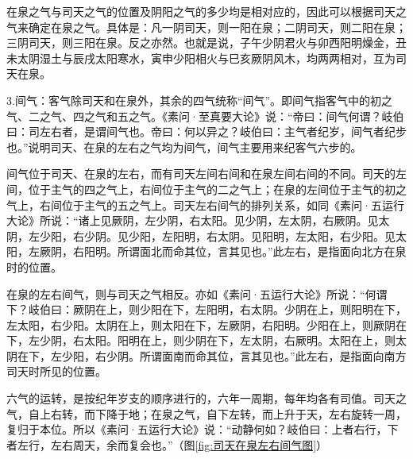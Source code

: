 \documentclass[12pt]{ctexbook}
\begin{document}
在泉之气与司天之气的位置及阴阳之气的多少均是相对应的，因此可以根据司天之气来确定在泉之气。具体是：凡一阴司天，则一阳在泉；二阴司天，则二阳在泉；三阴司天，则三阳在泉。反之亦然。也就是说，子午少阴君火与卯西阳明燥金，丑未太阴湿土与辰戌太阳寒水，寅申少阳相火与巳亥厥阴风木，均两两相对，互为司天在泉。

3.间气：客气除司天和在泉外，其余的四气统称“间气”。即间气指客气中的初之气、二之气、四之气和五之气。《素问·至真要大论》说：“帝曰：间气何谓？岐伯曰：司左右者，是谓间气也。帝曰：何以异之？岐伯曰：主气者纪岁，间气者纪步也。”说明司天、在泉的左右之气均为间气，间气主要用来纪客气六步的。

间气位于司天、在泉的左右，而有司天左间右间和在泉左间右间的不同。司天的左间，位于主气的四之气上，右间位于主气的二之气上；在泉的左间位于主气的初之气上，右间位于主气的五之气上。司天左右间气的排列关系，如同《素问·五运行大论》所说：“诸上见厥阴，左少阴，右太阳。见少阴，左太阴，右厥阴。见太阴，左少阳，右少阴。见少阳，左阳明，右太阴。见阳明，左太阳，右少阳。见太阳，左厥阴，右阳明。所谓面北而命其位，言其见也。”此左右，是指面向北方在泉时的位置。

在泉的左右间气，则与司天之气相反。亦如《素问·五运行大论》所说：“何谓下？岐伯曰：厥阴在上，则少阳在下，左阳明，右太阴。少阴在上，则阳明在下，左太阳，右少阳。太阴在上，则太阳在下，左厥阴，右阳明。少阳在上，则厥阴在下，左少阴，右太阳。阳明在上，则少阴在下，左太阴，右厥明。太阳在上，则太阴在下，左少阳，右少阴。所谓面南而命其位，言其见也。”此左右，是指面向南方司天时所见的位置。

六气的运转，是按纪年岁支的顺序进行的，六年一周期，每年均各有司值。司天之气，自上右转，而下降于地；在泉之气，自下左转，而上升于天，左右旋转一周，复归于本位。所以《素问·五运行大论》说：“动静何如？岐伯曰：上者右行，下者左行，左右周天，余而复会也。”（图\ref{fig:司天在泉左右间气图}）
\end{document}
